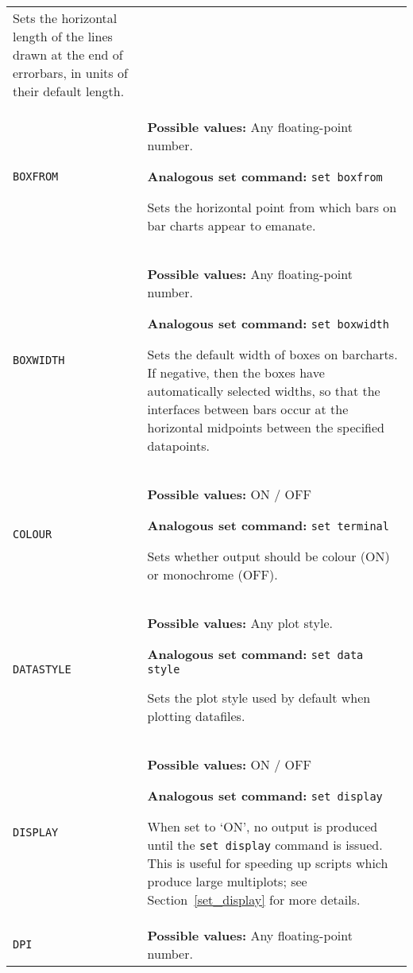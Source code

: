 \documentclass[a4paper,onecolumn,11pt]{book}
\begin{document}
\begin{longtable}{p{3.4cm}p{9cm}}
                   Sets the horizontal length of the lines drawn at the end of errorbars, in units of their default length.
                   \\
\texttt{BOXFROM} & \textbf{Possible values:} Any floating-point number.

                   \textbf{Analogous set command:} \texttt{set boxfrom}\index{set boxfrom command@\texttt{set boxfrom} command}

                   Sets the horizontal point from which bars on bar charts appear to emanate.
                   \\
\texttt{BOXWIDTH} & \textbf{Possible values:} Any floating-point number.

                   \textbf{Analogous set command:} \texttt{set boxwidth}\index{set boxwidth command@\texttt{set boxwidth} command}

                   Sets the default width of boxes on barcharts. If negative, then the boxes have automatically selected widths, so that the interfaces between bars occur at the horizontal midpoints between the specified datapoints.
                   \\
\texttt{COLOUR} & \textbf{Possible values:} ON / OFF

                   \textbf{Analogous set command:} \texttt{set terminal}\index{set terminal command@\texttt{set terminal} command}

                   Sets whether output should be colour (ON) or monochrome (OFF).
                   \\
\texttt{DATASTYLE} & \textbf{Possible values:} Any plot style. 

                   \textbf{Analogous set command:} \texttt{set data style}\index{set data style command@\texttt{set data style} command}
                   
                   Sets the plot style used by default when plotting datafiles.
                   \\
\texttt{DISPLAY} & \textbf{Possible values:} ON / OFF

                   \textbf{Analogous set command:} \texttt{set display}\index{set display command@\texttt{set display} command}

                   When set to `ON', no output is produced until the \texttt{set display} command is issued. This is useful for speeding up scripts which produce large multiplots; see Section~\ref{set_display} for more details.
                   \\
\texttt{DPI} & \textbf{Possible values:} Any floating-point number.


\end{longtable}
\end{document}
